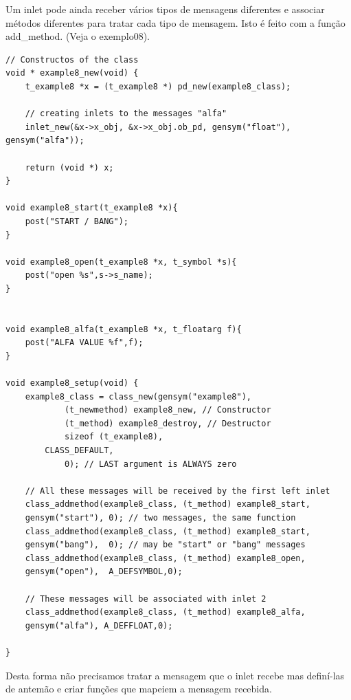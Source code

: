 \documentclass[10pt,a4paper]{report}
\begin{document}
Um inlet pode ainda receber vários tipos de mensagens diferentes e associar métodos diferentes para tratar cada tipo de mensagem. Isto é feito com a função add\_method.  (Veja o exemplo08).

\begin{lstlisting}
// Constructos of the class
void * example8_new(void) {
    t_example8 *x = (t_example8 *) pd_new(example8_class);

    // creating inlets to the messages "alfa"
    inlet_new(&x->x_obj, &x->x_obj.ob_pd, gensym("float"), gensym("alfa"));

    return (void *) x;
}

void example8_start(t_example8 *x){
    post("START / BANG");
}

void example8_open(t_example8 *x, t_symbol *s){
    post("open %s",s->s_name);
}


void example8_alfa(t_example8 *x, t_floatarg f){
	post("ALFA VALUE %f",f);
}

void example8_setup(void) {
    example8_class = class_new(gensym("example8"),
            (t_newmethod) example8_new, // Constructor
            (t_method) example8_destroy, // Destructor
            sizeof (t_example8),
	    CLASS_DEFAULT,
            0); // LAST argument is ALWAYS zero

    // All these messages will be received by the first left inlet
    class_addmethod(example8_class, (t_method) example8_start, 
	gensym("start"), 0); // two messages, the same function
    class_addmethod(example8_class, (t_method) example8_start, 
	gensym("bang"),  0); // may be "start" or "bang" messages
    class_addmethod(example8_class, (t_method) example8_open,  
	gensym("open"),  A_DEFSYMBOL,0);

    // These messages will be associated with inlet 2
    class_addmethod(example8_class, (t_method) example8_alfa,  
	gensym("alfa"), A_DEFFLOAT,0); 

}
\end{lstlisting}

Desta forma não precisamos tratar a mensagem que o inlet recebe mas definí-las de antemão e criar funções que mapeiem a mensagem recebida.
\end{document}
